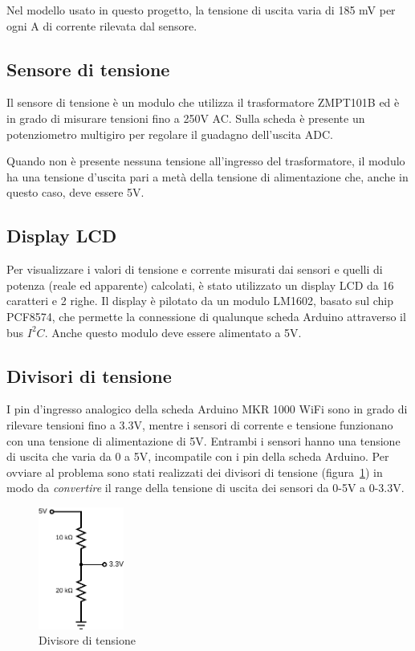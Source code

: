 \documentclass[italian,12pt,a4paper,oneside,final]{report}
\begin{document}
Nel modello usato in questo progetto, la tensione di uscita varia di 185 mV per ogni A di corrente rilevata dal sensore.

\subsection{Sensore di tensione}
Il sensore di tensione è un modulo che utilizza il trasformatore ZMPT101B ed è in grado di misurare tensioni fino a 250V AC.
Sulla scheda è presente un potenziometro multigiro per regolare il guadagno dell'uscita ADC.

Quando non è presente nessuna tensione all'ingresso del trasformatore, il modulo ha una tensione d'uscita pari a metà della tensione di alimentazione che, anche in questo caso, deve essere 5V.

\subsection{Display LCD}
Per visualizzare i valori di tensione e corrente misurati dai sensori e quelli di potenza (reale ed apparente) calcolati, è stato utilizzato un display LCD da 16 caratteri e 2 righe.
Il display è pilotato da un modulo LM1602, basato sul chip PCF8574, che permette la connessione di qualunque scheda Arduino attraverso il bus $I^2C$.
Anche questo modulo deve essere alimentato a 5V.

\newpage

\subsection{Divisori di tensione}
I pin d'ingresso analogico della scheda Arduino MKR 1000 WiFi sono in grado di rilevare tensioni fino a 3.3V, mentre i sensori di corrente e tensione funzionano con una tensione di alimentazione di 5V.
Entrambi i sensori hanno una tensione di uscita che varia da 0 a 5V, incompatile con i pin della scheda Arduino.
Per ovviare al problema sono stati realizzati dei divisori di tensione (figura~\ref{fig:voltage_divider}) in modo da \textit{convertire} il range della tensione di uscita dei sensori da 0-5V a 0-3.3V.

\begin{figure}[h]
	\centering
	\includegraphics[width=0.25\textwidth]{voltage_divider.pdf}
	\caption{Divisore di tensione}
	\label{fig:voltage_divider}
\end{figure}
\end{document}
